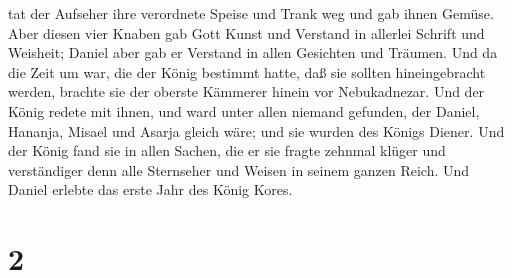 tat der Aufseher ihre verordnete Speise und Trank weg und gab ihnen
Gemüse.  Aber diesen vier Knaben gab Gott Kunst und
Verstand in allerlei Schrift und Weisheit; Daniel aber gab er Verstand
in allen Gesichten und Träumen.  Und da die Zeit um war,
die der König bestimmt hatte, daß sie sollten hineingebracht werden,
brachte sie der oberste Kämmerer hinein vor Nebukadnezar. 
Und der König redete mit ihnen, und ward unter allen niemand gefunden,
der Daniel, Hananja, Misael und Asarja gleich wäre; und sie wurden des
Königs Diener.  Und der König fand sie in allen Sachen, die
er sie fragte zehnmal klüger und verständiger denn alle Sternseher und
Weisen in seinem ganzen Reich.  Und Daniel erlebte das
erste Jahr des König Kores.

\hypertarget{section-1}{%
\section{2}\label{section-1}}

